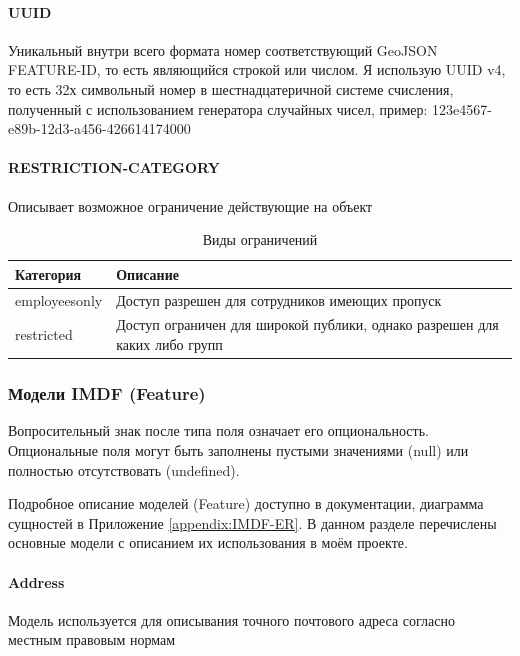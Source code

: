         \paragraph{UUID}
          Уникальный внутри всего формата номер соответствующий GeoJSON FEATURE-ID, то есть являющийся строкой или числом.
          Я использую UUID v4, то есть 32х символьный номер в шестнадцатеричной системе счисления, полученный с использованием генератора случайных чисел, пример: 123e4567-e89b-12d3-a456-426614174000

        \paragraph{RESTRICTION-CATEGORY}
          Описывает возможное ограничение действующие на объект
          \begin{center}
            \begin{xltabular}{\linewidth}{|l|X|}
              \caption{Виды ограничений}\\\hline
              Категория     & Описание                                                                   \\\hline
              employeesonly & Доступ разрешен для сотрудников имеющих пропуск                            \\\hline
              restricted    & Доступ ограничен для широкой публики, однако разрешен для каких либо групп \\\hline
            \end{xltabular}
          \end{center}

      \subsubsection{Модели IMDF (Feature)}
        Вопросительный знак после типа поля означает его опциональность. Опциональные поля могут быть заполнены пустыми значениями (null) или полностью отсутствовать (undefined).

        Подробное описание моделей (Feature) доступно в документации\cite{IMDFFeatures}, диаграмма сущностей в Приложение \ref{appendix:IMDF-ER}. В данном разделе перечислены основные модели с описанием их использования в моём проекте.
        \paragraph{Address}
          Модель используется для описывания точного почтового адреса согласно местным правовым нормам

